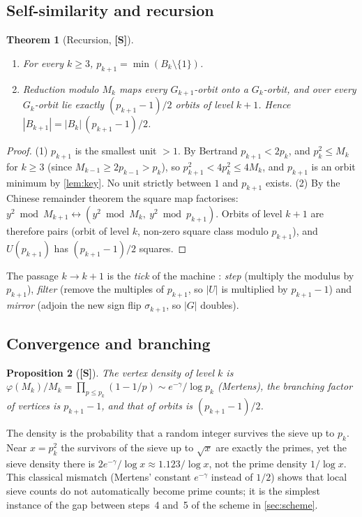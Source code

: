 \documentclass[11pt,a4paper]{article}
\newcommand{\statS}{\textsf{\textbf{[S]}}}
\theoremstyle{plain}
\newtheorem{theorem}{Theorem}[section]
\newtheorem{proposition}[theorem]{Proposition}
\theoremstyle{definition}
\theoremstyle{remark}
\begin{document}
\subsection{Self-similarity and recursion}
\begin{theorem}[Recursion, \statS]\label{thm:recursion}
\begin{enumerate}[itemsep=0pt]
\item For every $k\ge3$, $p_{k+1}=\min(B_k\setminus\{1\})$.
\item Reduction modulo $M_k$ maps every $G_{k+1}$-orbit onto a $G_k$-orbit, and
over every $G_k$-orbit lie exactly $(p_{k+1}-1)/2$ orbits of level $k+1$. Hence
$|B_{k+1}|=|B_k|\,(p_{k+1}-1)/2$.
\end{enumerate}
\end{theorem}
\begin{proof}
(1) $p_{k+1}$ is the smallest unit $>1$. By Bertrand $p_{k+1}<2p_k$, and
$p_k^2\le M_k$ for $k\ge3$ (since $M_{k-1}\ge2p_{k-1}>p_k$), so
$p_{k+1}^2<4p_k^2\le4M_k$, and $p_{k+1}$ is an orbit minimum by
\cref{lem:key}. No unit strictly between $1$ and $p_{k+1}$ exists.
(2) By the Chinese remainder theorem the square map factorises:
$y^2\bmod M_{k+1}\leftrightarrow(y^2\bmod M_k,\ y^2\bmod p_{k+1})$. Orbits of
level $k+1$ are therefore pairs (orbit of level $k$, non-zero square class
modulo $p_{k+1}$), and $U(p_{k+1})$ has $(p_{k+1}-1)/2$ squares.
\end{proof}
The passage $k\to k+1$ is the \emph{tick} of the machine \cite{K-recursive}:
\emph{step} (multiply the modulus by $p_{k+1}$), \emph{filter} (remove the
multiples of $p_{k+1}$, so $|U|$ is multiplied by $p_{k+1}-1$) and
\emph{mirror} (adjoin the new sign flip $\sigma_{k+1}$, so $|G|$ doubles).

\subsection{Convergence and branching}
\begin{proposition}[\statS]
The vertex density of level $k$ is
$\varphi(M_k)/M_k=\prod_{p\le p_k}(1-1/p)\sim e^{-\gamma}/\log p_k$ (Mertens),
the branching factor of vertices is $p_{k+1}-1$, and that of orbits is
$(p_{k+1}-1)/2$.
\end{proposition}
The density is the probability that a random integer survives the sieve up to
$p_k$. Near $x=p_k^2$ the survivors of the sieve up to $\sqrt x$ are exactly the
primes, yet the sieve density there is $2e^{-\gamma}/\log x\approx1.123/\log x$,
not the prime density $1/\log x$. This classical mismatch (Mertens' constant
$e^{-\gamma}$ instead of $1/2$) shows that local sieve counts do not
automatically become prime counts; it is the simplest instance of the gap
between steps~4 and~5 of the scheme in \cref{sec:scheme}.
\end{document}

